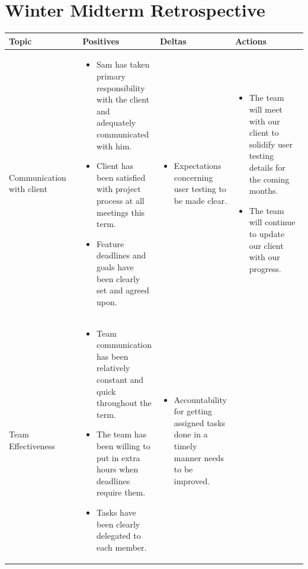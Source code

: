 \documentclass[letterpaper,10pt,titlepage,draftclsnofoot,onecolumn,onesided] {IEEEtran}
\begin{document}
\section{Winter Midterm Retrospective}
	\begin{center}
	\begin{singlespace}
		\begin{tabular}{ |  p{0.25\linewidth}  |  p{0.25\linewidth}  | p{0.25\linewidth} | p{0.25\linewidth} |}
		\hline
		Topic & Positives & Deltas & Actions \\ \hline
		
			Communication with client 
		& 
			\begin{itemize}
				\item Sam has taken primary responsibility with the client and adequately communicated with him.
				\item Client has been satisfied with project process at all meetings this term.
				\item Feature deadlines and goals have been clearly set and agreed upon.
			\end{itemize}
		& 
			\begin{itemize}
				\item Expectations concerning user testing to be made clear.
			\end{itemize}
		&
			\begin{itemize}
				\item The team will meet with our client to solidify user testing details for the coming months.
				\item The team will continue to update our client with our progress.
			\end{itemize} 
		\\ \hline
			Team Effectiveness 
		& 
			\begin{itemize}
				\item Team communication has been relatively constant and quick throughout the term.
				\item The team has been willing to put in extra hours when deadlines require them.
				\item Tasks have been clearly delegated to each member.
			\end{itemize}
		& 
			\begin{itemize}
				\item Accountability for getting assigned tasks done in a timely manner needs to be improved.
			\end{itemize}
		&
			\begin{itemize}

\end{itemize}
\end{tabular}
\end{singlespace}
\end{center}
\end{document}
